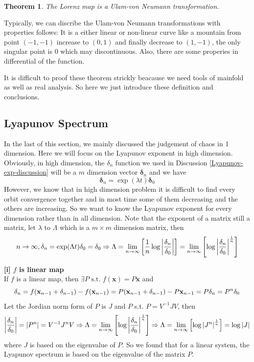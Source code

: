 \documentclass[12pt]{article}
\theoremstyle{plain}
\newtheorem{theorem}{\textbf{Theorem}}[section]
\begin{document}
\begin{theorem} The Lorenz map is a Ulam-von Neumann transformation.
\end{theorem}

Typically, we can discribe the Ulam-von Neumann transformations with properties follows: It is a either linear or non-linear curve like a mountain from point $(-1, -1)$ increase to $(0, 1)$ and finally decrease to $(1, -1)$, the only singular point is $0$ which may discontinuous. Also, there are some properies in differential of the function.

It is difficult to proof these theorem strickly beacause we need tools of mainfold as well as real analysis. So here we just introduce these definition and conclusions.


\subsection{Lyapunov Spectrum}
In the last of this section, we mainly discussed the judgement of chaos in 1 dimension. Here we will focus on the Lyapunov exponent in high dimension. Obviously, in high dimension, the $\delta_n$ function we used in Discussion \ref{Lyapunov-exp-discussion} will be a $m$ dimension vector $\mathbf \delta_n$ and we have
$$
\mathbf \delta_n = \exp(\lambda t)\mathbf\delta_0
$$
However, we know that in high dimension problem it is difficult to find every orbit convergence together and in most time some of them decreasing and the others are increasing. So we want to know the Lyapunov exponent for every dimension rather than in all dimension. Note that the exponent of a matrix still a matrix, let $\lambda$ to $\Lambda$ which is a $m\times m$ dimension matrix, then
$$
n\rightarrow \infty, \mathbf \delta_n = \exp(\Lambda t)\mathbf\delta_0 =  \mathbf\delta_0 
\Rightarrow \Lambda = \lim_{n \rightarrow \infty}\left[{1\over n}\log\left|\mathbf\delta_n \over \mathbf \delta_0\right|\right] 
= \lim_{n \rightarrow \infty}\left[\log\left|\mathbf\delta_n \over \mathbf \delta_0\right|^{1\over n}\right] 
$$

\textbf{[i] $f$ is linear map}
\\\noindent If $f$ is a linear map, then $\exists P \text{ s.t. } f(\mathbf x) = P\mathbf x$ and 
$$
\mathbf\delta_{n} = f(\mathbf x_{n-1} + \mathbf\delta_{n-1}) - f(\mathbf x_{n-1}) = P(\mathbf x_{n-1} + \mathbf\delta_{n-1}) - P\mathbf x_{n-1}= P\mathbf \mathbf\delta_n = P^{n} \delta_0
$$
Let the Jordian norm form of $P$ is $J$ and $P$ s.t. $P = V^{-1} J V$, then 
$$
\left|{\delta_n \over \delta_0}\right| = |P^{n}| = V^{-1} J^n V 
\Rightarrow \Lambda = \lim_{n \rightarrow \infty}\left[\log\left|\mathbf\delta_n \over \mathbf \delta_0\right|^{1\over n}\right] 
\Rightarrow \Lambda = \lim_{n \rightarrow \infty}\left[\log\left|J^n\right|^{1\over n}\right] = \log|J|
$$
where $J$ is based on the eigenvalue of $P$. So we found that for a linear system, the Lyapunov spectrum is based on the eigenvalue of the matrix $P$.
\end{document}

